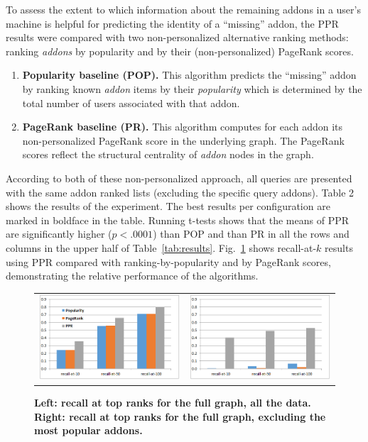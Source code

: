 \documentclass[10pt,letterpaper]{article}
\begin{document}
To assess the extent to which information about the remaining addons in a user's machine is helpful for predicting the identity of a ``missing'' addon, the PPR results were compared with two non-personalized alternative ranking methods: ranking \textit{addons} by popularity and by their (non-personalized) PageRank scores.

\begin{enumerate}
\item  \textbf{Popularity baseline (POP). }This algorithm predicts the ``missing'' addon by ranking known \textit{addon} items by their \textit{popularity} which is determined by the total number of users associated with that addon. 

\item  \textbf{PageRank baseline (PR). }This algorithm computes for each addon its non-personalized PageRank score in the underlying graph. The PageRank scores reflect the structural centrality of \textit{addon} nodes in the graph.
\end{enumerate}

According to both of these non-personalized approach, all queries are presented with the same addon ranked lists (excluding the specific query addons). Table 2 shows the results of the experiment. The best results per configuration are marked in boldface in the table. Running t-tests shows that the means of PPR are significantly higher ($p<.0001$) than POP and than PR in all the rows and columns in the upper half of Table~\ref{tab:results}. Fig.~\ref{fig:results} shows recall-at-$k$ results using PPR compared with ranking-by-popularity and by PageRank scores, demonstrating the relative performance of the algorithms.

\begin{figure}[!h]
\caption{{\bf Left: recall at top ranks for the full graph, all the data. Right: recall at top ranks for the full graph, excluding the most popular addons.}}
\begin{tabular}{cc}
\includegraphics[width=2.5in]{figures/pop-final.png} & \includegraphics[width=2.5in]{figures/sans-popular-final.png} \\
\end{tabular}
\label{fig:results}
\end{figure}
\end{document}
